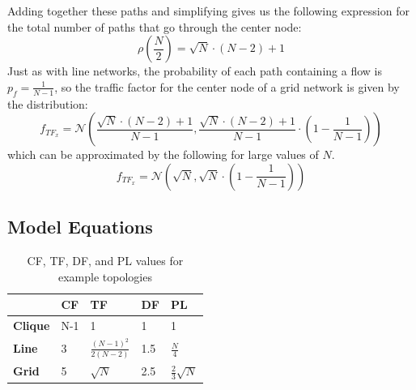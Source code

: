 Adding together these paths and simplifying gives us the following expression for the total number of paths that go through the center node: 
\begin{equation}
	\rho(\frac{N}{2}) = \sqrt{N} \cdot (N-2) + 1
\end{equation}
Just as with line networks, the probability of each path containing a flow is $p_f = \frac{1}{N-1}$, so the traffic factor for the center node of a grid network is given by the distribution:
\begin{equation*}
	f_{TF_x} = \mathcal{N}( \frac{\sqrt{N} \cdot (N-2) + 1}{N-1}, \frac{\sqrt{N} \cdot (N-2) + 1}{N-1} \cdot ( 1 - \frac{1}{N-1} )  )
\end{equation*}
which can be approximated by the following for large values of $N$.  
\begin{equation*}
	f_{TF_x} = \mathcal{N}( \sqrt{N}, \sqrt{N} \cdot ( 1 - \frac{1}{N-1} )  )
\end{equation*}








\subsection{Model Equations}
\begin{table}[h]
\centering
\begin{tabular}{l|l|l|l|l|}
\cline{2-5}
                            					 & \textbf{CF}  					& \textbf{TF}   				& \textbf{DF}	& \textbf{PL} 			\\ \hline
\multicolumn{1}{|l|}{\textbf{Clique}} 	& N-1 							& 1                              		& 1  			& 1 					\\ \hline
\multicolumn{1}{|l|}{\textbf{Line}}   	& 3   							& $\frac{(N-1)^2}{2(N-2)}$ 	& 1.5 			& $\frac{N}{4}$			\\ \hline
\multicolumn{1}{|l|}{\textbf{Grid}}   	& 5   							& $\sqrt{N}$                       	&  2.5			& $\frac{2}{3} \sqrt{N}$   \\ \hline
\end{tabular}
\caption{CF, TF, DF, and PL values for example topologies}
\label{table:rf_ff_sf_values}
\end{table}

